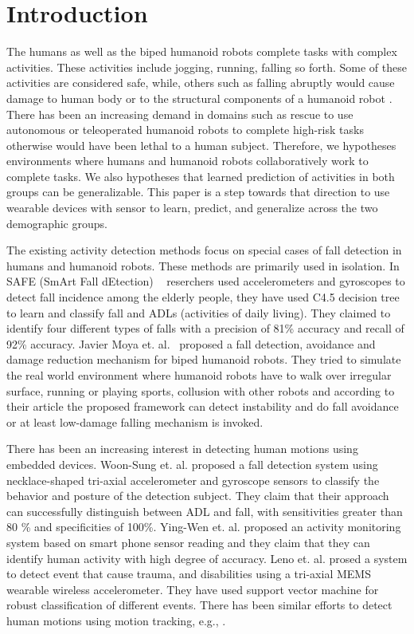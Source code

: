 \documentclass[letterpaper]{article}
\begin{document}
\section{Introduction}

The humans as well as the biped humanoid robots complete tasks with complex activities. These 
activities include jogging, running, falling so forth. Some of these activities are 
considered safe, while, others such as falling abruptly would cause damage to human body 
or to the structural components of a humanoid robot \cite{li2009accurate}. There has been an 
increasing demand in domains such as rescue to use autonomous or teleoperated humanoid robots to 
complete high-risk tasks otherwise would have been lethal to a human subject. Therefore, we 
hypotheses environments where humans and humanoid robots collaboratively work to complete 
tasks. We also hypotheses that learned prediction of activities in both groups can be 
generalizable. This paper is a step towards that direction to use wearable devices with sensor to 
learn, predict, and generalize across the two demographic groups.



The existing activity detection methods focus on special cases of fall detection in humans and 
humanoid robots. These methods are primarily used in isolation.  
In SAFE (SmArt Fall dEtection) {~\cite{ojetola2011fall}} reserchers used accelerometers and 
gyroscopes 
to detect fall incidence among the elderly people, they have used C4.5 decision tree to learn and 
classify fall and ADLs (activities of daily living). They claimed to identify four different types 
of falls with a precision of 81\% accuracy and recall of 92\% accuracy.
Javier Moya et. al.{~\cite{moya2014fall}} proposed a fall detection, avoidance and damage reduction 
mechanism for biped humanoid robots. They tried to simulate the real world environment where 
humanoid robots have to walk over irregular surface, running or playing sports, collusion with 
other 
robots and according to their article the proposed framework can detect instability and do fall 
avoidance or at least low-damage falling mechanism is invoked. 

There has been an increasing interest in detecting human motions using embedded devices. Woon-Sung
et. al. \cite{baek2013real} proposed  a fall  detection  system  using necklace-shaped tri-axial
accelerometer  and  gyroscope  sensors  to  classify  the  behavior  and  posture  of  the detection
 subject. They claim that their  approach  can  successfully  distinguish between  ADL and  fall, 
with  sensitivities  greater  than  80 \%  and specificities  of  100\%. Ying-Wen et. al.
\cite{bai2013recognition} proposed an activity monitoring system based on smart phone sensor
reading and they claim that they can identify human activity with high degree of accuracy. Leno et.
al. \cite{leone2013supervised} prosed a system to detect event that cause trauma, and disabilities
using a tri-axial MEMS wearable wireless accelerometer. They have used support vector machine for
robust classification of different events. There has been similar efforts to detect human motions
using motion tracking, e.g., \cite{dumitrache2013fall,kumarwearable,liang2012pre}.
\end{document}
